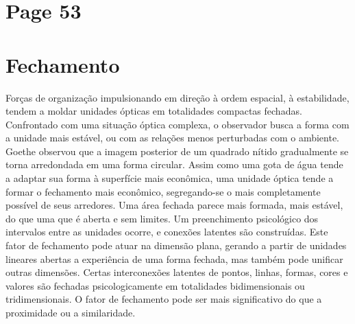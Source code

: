 \documentclass[a4paper]{article}
\begin{document}
\newpage
\section*{Page 53}

\section*{Fechamento}

Forças de organização impulsionando em direção à ordem espacial, à estabilidade, tendem a moldar unidades ópticas em totalidades compactas fechadas. Confrontado com uma situação óptica complexa, o observador busca a forma com a unidade mais estável, ou com as relações menos perturbadas com o ambiente. Goethe observou que a imagem posterior de um quadrado nítido gradualmente se torna arredondada em uma forma circular. Assim como uma gota de água tende a adaptar sua forma à superfície mais econômica, uma unidade óptica tende a formar o fechamento mais econômico, segregando-se o mais completamente possível de seus arredores. Uma área fechada parece mais formada, mais estável, do que uma que é aberta e sem limites. Um preenchimento psicológico dos intervalos entre as unidades ocorre, e conexões latentes são construídas. Este fator de fechamento pode atuar na dimensão plana, gerando a partir de unidades lineares abertas a experiência de uma forma fechada, mas também pode unificar outras dimensões. Certas interconexões latentes de pontos, linhas, formas, cores e valores são fechadas psicologicamente em totalidades bidimensionais ou tridimensionais. O fator de fechamento pode ser mais significativo do que a proximidade ou a similaridade.
\end{document}
